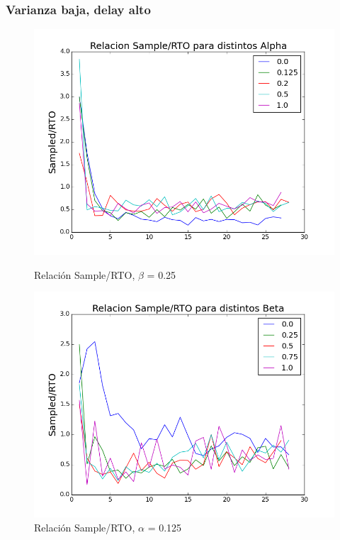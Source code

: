 \subsubsection{Varianza baja, delay alto}

\begin{figure}[H]
\begin{minipage}{0.5\linewidth}
\includegraphics[width=\linewidth]{../graficos/alphad025var2drop25.png}
\caption{Relación Sample/RTO, $\beta$ = 0.25}\label{fig:alpha-var2-drop25-alto}
\end{minipage}
\hfill
\begin{minipage}{0.5\linewidth}
\includegraphics[width=\linewidth]{../graficos/betad025var2drop25.png}
\caption{Relación Sample/RTO, $\alpha$ = 0.125}\label{fig:beta-var2-drop25-alto}
\end{minipage}
\end{figure}

